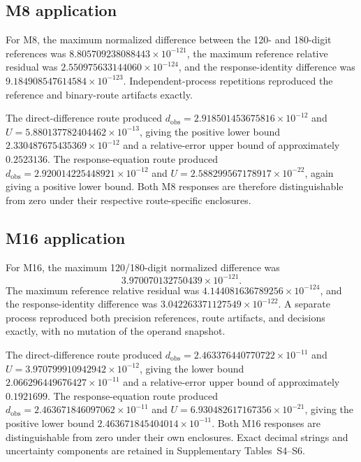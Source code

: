 \documentclass[preprint,12pt]{elsarticle}
\begin{document}
\subsection{M8 application}

For M8, the maximum normalized difference between the 120- and 180-digit references was $8.805709238088443\times10^{-121}$, the maximum reference relative residual was $2.550975633144060\times10^{-124}$, and the response-identity difference was $9.184908547614584\times10^{-123}$. Independent-process repetitions reproduced the reference and binary-route artifacts exactly.

The direct-difference route produced $d_{\mathrm{obs}}=2.918501453675816\times10^{-12}$ and $U=5.880137782404462\times10^{-13}$, giving the positive lower bound $2.330487675435369\times10^{-12}$ and a relative-error upper bound of approximately $0.2523136$. The response-equation route produced $d_{\mathrm{obs}}=2.920014225448921\times10^{-12}$ and $U=2.588299567178917\times10^{-22}$, again giving a positive lower bound. Both M8 responses are therefore distinguishable from zero under their respective route-specific enclosures.

\subsection{M16 application}

For M16, the maximum 120/180-digit normalized difference was
\[
3.970070132750439\times10^{-121}.
\]
The maximum reference relative residual was $4.144081636789256\allowbreak\times10^{-124}$, and the response-identity difference was $3.042263371127549\allowbreak\times10^{-122}$. A separate process reproduced both precision references, route artifacts, and decisions exactly, with no mutation of the operand snapshot.

The direct-difference route produced $d_{\mathrm{obs}}=2.463376440770722\allowbreak\times10^{-11}$ and $U=3.970799910942942\allowbreak\times10^{-12}$, giving the lower bound $2.066296449676427\allowbreak\times10^{-11}$ and a relative-error upper bound of approximately $0.1921699$. The response-equation route produced $d_{\mathrm{obs}}=2.463671846097062\allowbreak\times10^{-11}$ and $U=6.930482617167356\allowbreak\times10^{-21}$, giving the positive lower bound $2.463671845404014\allowbreak\times10^{-11}$. Both M16 responses are distinguishable from zero under their own enclosures. Exact decimal strings and uncertainty components are retained in Supplementary Tables~S4--S6.
\end{document}
